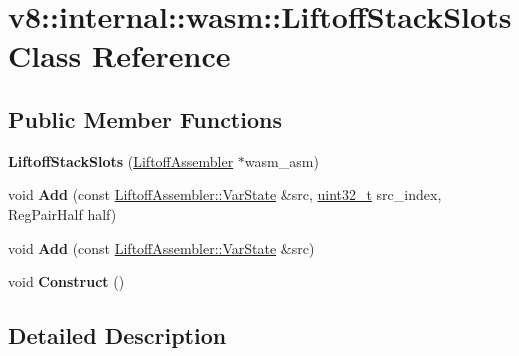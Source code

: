 \hypertarget{classv8_1_1internal_1_1wasm_1_1LiftoffStackSlots}{}\section{v8\+:\+:internal\+:\+:wasm\+:\+:Liftoff\+Stack\+Slots Class Reference}
\label{classv8_1_1internal_1_1wasm_1_1LiftoffStackSlots}
\subsection*{Public Member Functions}
\begin{DoxyCompactItemize}
\item 
\mbox{\label{classv8_1_1internal_1_1wasm_1_1LiftoffStackSlots_ad262c1148ac88b4dd6df63177ff42036}} 
{\bfseries Liftoff\+Stack\+Slots} (\mbox{\hyperlink{classv8_1_1internal_1_1wasm_1_1LiftoffAssembler}{Liftoff\+Assembler}} $\ast$wasm\+\_\+asm)
\item 
\mbox{\label{classv8_1_1internal_1_1wasm_1_1LiftoffStackSlots_aa6633d7143f602943652d8221889dc76}} 
void {\bfseries Add} (const \mbox{\hyperlink{classv8_1_1internal_1_1wasm_1_1LiftoffAssembler_1_1VarState}{Liftoff\+Assembler\+::\+Var\+State}} \&src, \mbox{\hyperlink{classuint32__t}{uint32\+\_\+t}} src\+\_\+index, Reg\+Pair\+Half half)
\item 
\mbox{\label{classv8_1_1internal_1_1wasm_1_1LiftoffStackSlots_a7873e8217dcdd95ef10e28ebaa4d891d}} 
void {\bfseries Add} (const \mbox{\hyperlink{classv8_1_1internal_1_1wasm_1_1LiftoffAssembler_1_1VarState}{Liftoff\+Assembler\+::\+Var\+State}} \&src)
\item 
\mbox{\label{classv8_1_1internal_1_1wasm_1_1LiftoffStackSlots_af2dca6057a19c0a3f02f8c1a9752a994}} 
void {\bfseries Construct} ()
\end{DoxyCompactItemize}


\subsection{Detailed Description}


